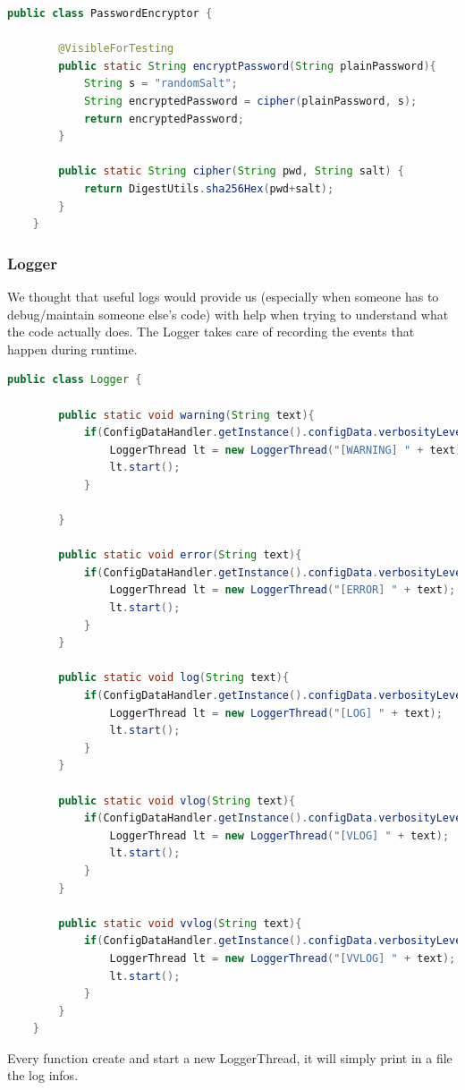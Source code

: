 \begin{lstlisting}[language=Java]
	public class PasswordEncryptor {
		
		@VisibleForTesting
		public static String encryptPassword(String plainPassword){
			String s = "randomSalt";
			String encryptedPassword = cipher(plainPassword, s);
			return encryptedPassword;
		}
		
		public static String cipher(String pwd, String salt) {
			return DigestUtils.sha256Hex(pwd+salt);
		}
	}
\end{lstlisting}
\subsubsection{Logger}
We thought that useful logs would provide us (especially when someone has to debug/maintain someone else’s code) with help when trying to understand what the code actually does. The Logger takes care of recording the events that happen during runtime.
\begin{lstlisting}[language=Java]
	public class Logger {
		
		public static void warning(String text){
			if(ConfigDataHandler.getInstance().configData.verbosityLevel >= 1){
				LoggerThread lt = new LoggerThread("[WARNING] " + text);
				lt.start();
			}
			
		}
		
		public static void error(String text){
			if(ConfigDataHandler.getInstance().configData.verbosityLevel >= 1){
				LoggerThread lt = new LoggerThread("[ERROR] " + text);
				lt.start();
			}
		}
		
		public static void log(String text){
			if(ConfigDataHandler.getInstance().configData.verbosityLevel >= 1){
				LoggerThread lt = new LoggerThread("[LOG] " + text);
				lt.start();
			}
		}
		
		public static void vlog(String text){
			if(ConfigDataHandler.getInstance().configData.verbosityLevel >= 2){
				LoggerThread lt = new LoggerThread("[VLOG] " + text);
				lt.start();
			}
		}
		
		public static void vvlog(String text){
			if(ConfigDataHandler.getInstance().configData.verbosityLevel >= 3){
				LoggerThread lt = new LoggerThread("[VVLOG] " + text);
				lt.start();
			}
		}
	}
\end{lstlisting}

Every function create and start a new LoggerThread, it will simply print in a file the log infos.

